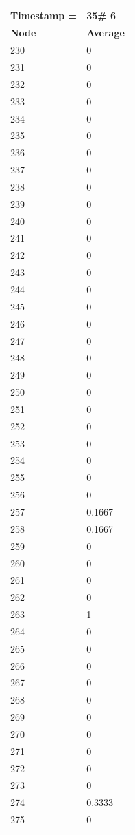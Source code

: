 \begin{tabular}{|l||l|}
\hline
\textbf{Timestamp =} & \textbf{35}\# 6\\\hline
	\textbf{Node} & \textbf{Average} \\ \hline
\hline
	230 & 0 \\ \hline
	231 & 0 \\ \hline
	232 & 0 \\ \hline
	233 & 0 \\ \hline
	234 & 0 \\ \hline
	235 & 0 \\ \hline
	236 & 0 \\ \hline
	237 & 0 \\ \hline
	238 & 0 \\ \hline
	239 & 0 \\ \hline
	240 & 0 \\ \hline
	241 & 0 \\ \hline
	242 & 0 \\ \hline
	243 & 0 \\ \hline
	244 & 0 \\ \hline
	245 & 0 \\ \hline
	246 & 0 \\ \hline
	247 & 0 \\ \hline
	248 & 0 \\ \hline
	249 & 0 \\ \hline
	250 & 0 \\ \hline
	251 & 0 \\ \hline
	252 & 0 \\ \hline
	253 & 0 \\ \hline
	254 & 0 \\ \hline
	255 & 0 \\ \hline
	256 & 0 \\ \hline
	257 & 0.1667 \\ \hline
	258 & 0.1667 \\ \hline
	259 & 0 \\ \hline
	260 & 0 \\ \hline
	261 & 0 \\ \hline
	262 & 0 \\ \hline
	263 & 1 \\ \hline
	264 & 0 \\ \hline
	265 & 0 \\ \hline
	266 & 0 \\ \hline
	267 & 0 \\ \hline
	268 & 0 \\ \hline
	269 & 0 \\ \hline
	270 & 0 \\ \hline
	271 & 0 \\ \hline
	272 & 0 \\ \hline
	273 & 0 \\ \hline
	274 & 0.3333 \\ \hline
	275 & 0 \\ \hline
\end{tabular}

